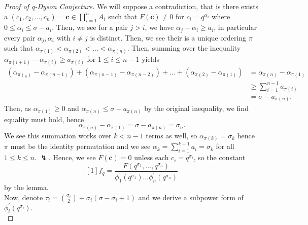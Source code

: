 \begin{proof}[Proof of q-Dyson Conjecture]
We will suppose a contradiction, that is there exists a \(\left( c_1, c_2, \ldots, c_{n} \right) = \textbf{c} \in \prod_{i= 1}^{n} A_{i}\) such that \(F\left( \textbf{c} \right) \neq 0 \) for \(c_{i} = q^{\alpha_{i}}\) where \(0 \le \alpha_{i} \le \sigma - a_{i}\). Then, we see for a pair \(j > i\), we have \(\alpha _{j} - \alpha _{i} \ge a_{i}\), in particular every pair \(\alpha_{j}, \alpha_{i}	\) with \(i \neq j\) is distinct. Then, we see their is a unique ordering \(\pi\) such that \(\alpha_{\pi\left( 1 \right) } < \alpha_{\pi\left( 2 \right) } < \ldots < \alpha_{\pi\left( n \right) }\). Then, summing over the inequality \(\alpha_{\pi\left( i + 1 \right)}  - \alpha_{\pi\left( i \right) } \ge a_{\pi\left( i \right) }\) for \(1 \le i \le n-1\) yields
	\begin{align*}
		\left( \alpha_{\pi \left( _{n} \right) } - \alpha_{\pi\left( n-1 \right) } \right) + \left( \alpha_{\pi\left( n-1 \right) } - \alpha_{\pi\left( n-2 \right) } \right)  + \ldots + \left( \alpha_{\pi\left( 2 \right) } - \alpha_{\pi\left( 1 \right) } \right) &= \alpha_{\pi\left( n \right) } - \alpha_{\pi\left( 1 \right) } \\
																																	       &\ge \sum_{i= 1}^{n-1} a_{\pi \left( i \right) } \\
																																	       &= \sigma - a_{\pi\left( n \right) }
	.\end{align*}
	Then, as \(\alpha_{\pi\left( 1 \right) } \ge 0\) and \(\alpha_{\pi\left( n \right) } \le \sigma - a_{\pi\left( n \right) }\) by the original inequality, we find equality must hold, hence \[
		\alpha_{\pi\left( n \right) } - \alpha_{\pi\left( 1 \right) } = \sigma - a_{\pi\left( n \right) } = \sigma_{n}
	.\]
	We see this summation works over \(k < n-1\) terms as well, so \(\alpha_{\pi\left( k \right) } = \sigma_{k}\) hence \(\pi\) must be the identity permutation and we see \(\alpha_{k} = \sum_{i= 1}^{k-1} a_{i} = \sigma_{k} \) for all \(1 \le k \le n\). \(\lightning\). Hence, we see \(F\left( \textbf{c} \right) = 0 \) unless each \(c_{i} = q^{\sigma_{i}}\), so the constant \[\left[ 1 \right] f_{q} = \dfrac{F\left( q^{\sigma_1}, \ldots, q^{\sigma_{n}} \right) }{\phi_1^{\prime}\left( q^{\sigma_1} \right) \ldots \phi_n^{\prime}\left( q^{\sigma_{n}} \right) }\] by the lemma.\\
	Now, denote \(\tau_{i} = \binom{\sigma_{i}}{2} + \sigma_{i} \left( \sigma - \sigma_{i} + 1 \right) \) and we derive a subpower form of \(\phi _{i}^{\prime} \left( q^{\sigma_{i}} \right) \).\\

\end{proof}
